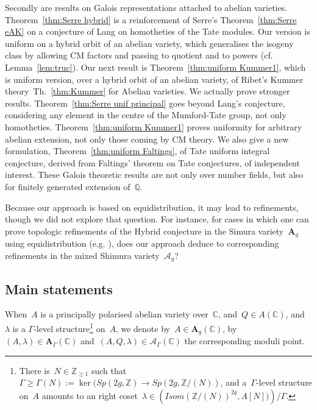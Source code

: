 \documentclass[12pt]{amsart}
\newcommand{\Z}{{\mathbb Z}}
\newcommand{\Q}{{\mathbb Q}}
\newcommand{\C}{{\mathbb C}}
\begin{document}
Secondly are results on Galois representations attached to abelian varieties. Theorem~\ref{thm:Serre hybrid} is a reinforcement of Serre's Theorem~\ref{thm:Serre eAK} on a conjecture of Lang on homotheties of the Tate modules. Our version is uniform on a hybrid orbit of an abelian variety, which generalises the isogeny class by allowing CM factors and passing to quotient and to powers (cf. Lemma~\ref{lem:truc}). Our next result is Theorem~\ref{thm:uniform Kummer1}, which is uniform version, over a hybrid orbit of an abelian variety, of Ribet's Kummer theory~Th.~\ref{thm:Kummer} for Abelian varieties. We actually prove stronger results. Theorem~\ref{thm:Serre unif principal} goes beyond Lang's conjecture, considering any element in the centre of the Mumford-Tate group, not only homotheties. Theorem~\ref{thm:uniform Kummer1} proves uniformity for arbitrary abelian extension, not only those coming by CM theory. We also give a new formulation, Theorem~\ref{thm:uniform Faltings}, of Tate uniform integral conjecture, derived from Faltings' theorem on Tate conjectures, of independent interest. 
These Galois theoretic results are not only over number fields, but also for finitely generated extension of~$\Q$. 

Because our approach is based on equidistribution, it may lead to refinements, though we did not explore that question. For instance, for cases in which one can prove topologic refinements of the Hybrid conjecture in the Simura variety~$\mathbf{A}_g$ using equidistribution (e.g. \cite{Duke,Ilya,RY:SHecke}), does our approach deduce to corresponding refinements in the mixed Shimura variety~$\mathcal{A}_g$?

\subsection{Main statements}
When~$A$ is a principally polarised abelian variety over~$\C$, and~$Q\in A(\C)$, and~$\lambda$ is a $\Gamma$-level structure\footnote{There is~$N\in\Z_{\geq1}$ such that~$\Gamma\geq \Gamma(N):=\ker (Sp(2g,\Z)\to Sp(2g,\Z/(N))$, and a~$\Gamma$-level structure on~$A$ amounts to an right coset~$\lambda\in \left(Isom(\Z/(N))^{2g},A[N])\right)/\Gamma$.} on~$A$, we denote by~$A\in \mathbf{A}_g(\C)$, by~$(A,\lambda)\in \mathbf{A}_\Gamma(\C)$ and~$(A,Q,\lambda)\in \mathcal{A}_\Gamma(\C)$ the corresponding moduli point.


\end{document}
